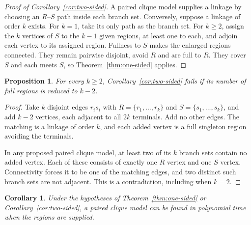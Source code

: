 \documentclass[11pt]{amsart}
\newtheorem{corollary}[theorem]{Corollary}
\newtheorem{proposition}[theorem]{Proposition}
\begin{document}
\begin{proof}[Proof of Corollary~\ref{cor:two-sided}]
A paired clique model supplies a linkage by choosing an $R$--$S$
path inside each branch set. Conversely, suppose a linkage of order
$k$ exists. For $k=1$, take its only path as the branch set. For
$k\geq2$, assign the $k$ vertices of $S$ to the $k-1$ given regions,
at least one to each, and adjoin each vertex to its assigned region.
Fullness to $S$ makes the enlarged regions connected. They remain
pairwise disjoint, avoid $R$ and are full to $R$. They cover $S$ and
each meets $S$, so Theorem~\ref{thm:one-sided} applies.
\end{proof}

\begin{proposition}\label{prop:sharp}
For every $k\geq2$, Corollary~\ref{cor:two-sided} fails if its
number of full regions is reduced to $k-2$.
\end{proposition}

\begin{proof}
Take $k$ disjoint edges $r_is_i$ with
$R=\{r_1,\ldots,r_k\}$ and $S=\{s_1,\ldots,s_k\}$, and add
$k-2$ vertices, each adjacent to all $2k$ terminals. Add no other
edges. The matching is a linkage of order $k$, and each added vertex
is a full singleton region avoiding the terminals.

In any proposed paired clique model, at least two of its $k$ branch
sets contain no added vertex. Each of these consists of exactly one
$R$ vertex and one $S$ vertex. Connectivity forces it to be one of
the matching edges, and two distinct such branch sets are not
adjacent. This is a contradiction, including when $k=2$.
\end{proof}

\begin{corollary}\label{cor:algorithm}
Under the hypotheses of Theorem~\ref{thm:one-sided} or
Corollary~\ref{cor:two-sided}, a paired clique model can be found in
polynomial time when the regions are supplied.
\end{corollary}
\end{document}
